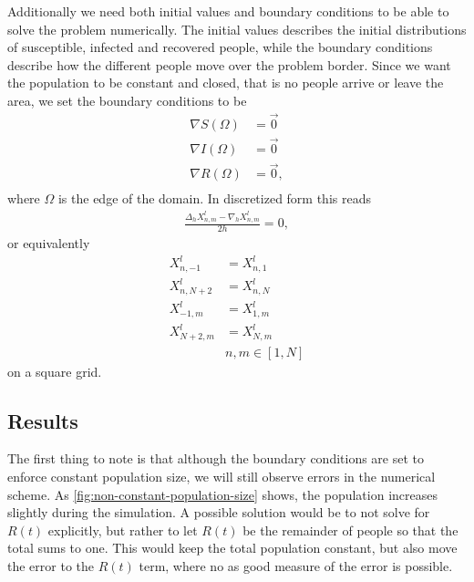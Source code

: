Additionally we need both initial values and boundary conditions to be able to solve the problem numerically.
The initial values describes the initial distributions of susceptible, infected and recovered people, while
the boundary conditions describe how the different people move over the problem border. Since we want the population to be constant and closed, that is no people arrive or leave
the area, we set the boundary conditions to be
\begin{equation}
    \begin{split}
        \nabla S(\Omega) &= \Vec{0} \\
        \nabla I(\Omega) &= \Vec{0} \\
        \nabla R(\Omega) &= \Vec{0}, \\
    \end{split}
\end{equation}
where $\Omega$ is the edge of the domain. In discretized form this reads
\begin{equation}
    \begin{split}
        \frac{\Delta_h X_{n,m}^l - \nabla_h X_{n,m}^l}{2h} = 0,
    \end{split}
\end{equation}
or equivalently
\begin{equation}
    \begin{split}
        X_{n,-1}^l &= X_{n, 1}^l \\
        X_{n,N+2}^l &= X_{n, N}^l \\
        X_{-1,m}^l &= X_{1, m}^l \\
        X_{N+2,m}^l &= X_{N, m}^l \\
        & n,m \in [1, N]
    \end{split}
\end{equation}
on a square grid.

\subsection{Results}
The first thing to note is that although the boundary conditions are set to enforce constant population size, we will still observe errors in the numerical scheme. As \ref{fig:non-constant-population-size}
shows, the population increases slightly during the simulation. 
A possible solution would be to not 
solve for $R(t)$ explicitly, but rather to let $R(t)$ be the remainder of people so that the total sums to one. This would keep the total population constant, but also move the error to the
$R(t)$ term, where no as good measure of the error is possible.


